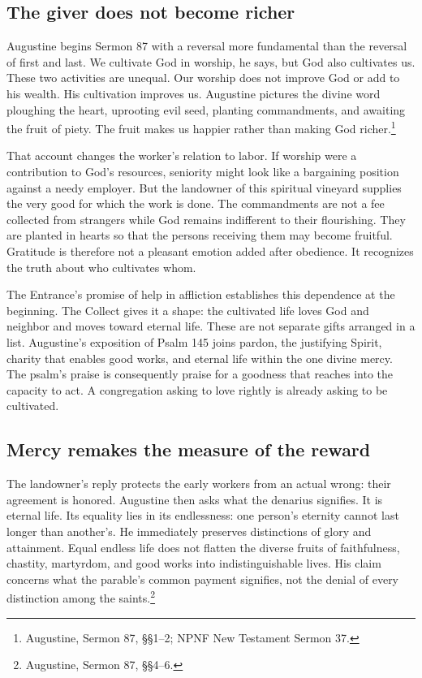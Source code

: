 \subsection{The giver does not become richer}
Augustine begins Sermon 87 with a reversal more fundamental than the reversal of first and last. We cultivate God in worship, he says, but God also cultivates us. These two activities are unequal. Our worship does not improve God or add to his wealth. His cultivation improves us. Augustine pictures the divine word ploughing the heart, uprooting evil seed, planting commandments, and awaiting the fruit of piety. The fruit makes us happier rather than making God richer.\footnote{Augustine, Sermon 87, §§1--2; NPNF New Testament Sermon 37.}

That account changes the worker's relation to labor. If worship were a contribution to God's resources, seniority might look like a bargaining position against a needy employer. But the landowner of this spiritual vineyard supplies the very good for which the work is done. The commandments are not a fee collected from strangers while God remains indifferent to their flourishing. They are planted in hearts so that the persons receiving them may become fruitful. Gratitude is therefore not a pleasant emotion added after obedience. It recognizes the truth about who cultivates whom.

The Entrance's promise of help in affliction establishes this dependence at the beginning. The Collect gives it a shape: the cultivated life loves God and neighbor and moves toward eternal life. These are not separate gifts arranged in a list. Augustine's exposition of Psalm 145 joins pardon, the justifying Spirit, charity that enables good works, and eternal life within the one divine mercy. The psalm's praise is consequently praise for a goodness that reaches into the capacity to act. A congregation asking to love rightly is already asking to be cultivated.

\subsection{Mercy remakes the measure of the reward}
The landowner's reply protects the early workers from an actual wrong: their agreement is honored. Augustine then asks what the denarius signifies. It is eternal life. Its equality lies in its endlessness: one person's eternity cannot last longer than another's. He immediately preserves distinctions of glory and attainment. Equal endless life does not flatten the diverse fruits of faithfulness, chastity, martyrdom, and good works into indistinguishable lives. His claim concerns what the parable's common payment signifies, not the denial of every distinction among the saints.\footnote{Augustine, Sermon 87, §§4--6.}


